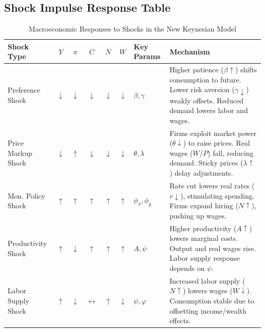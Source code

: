 \documentclass{article}
\begin{document}
{{\subsection{Shock Impulse Response Table}

\begin{table}[H]
\centering
\caption{Macroeconomic Responses to Shocks in the New Keynesian Model}
\label{table:shocks}
\footnotesize %
\setlength{\tabcolsep}{4pt} %
\renewcommand{\arraystretch}{1.2} %
\begin{tabularx}{\textwidth}{>{\raggedright\arraybackslash}p{2.2cm}cccccl>{\raggedright\arraybackslash}X}
\toprule
\textbf{Shock Type} & \(Y\) & \(\pi\) & \(C\) & \(N\) & \(W\) & \textbf{Key Params} & \textbf{Mechanism} \\
\midrule
Preference Shock & \(\downarrow\) & \(\downarrow\) & \(\downarrow\) & \(\downarrow\) & \(\downarrow\) 
& \(\beta, \gamma\) 
& Higher patience (\(\beta \uparrow\)) shifts consumption to future. Lower risk aversion (\(\gamma \downarrow\)) weakly offsets. Reduced demand lowers labor and wages. \\ 

Price Markup Shock & \(\downarrow\) & \(\uparrow\) & \(\downarrow\) & \(\downarrow\) & \(\downarrow\) 
& \(\theta, \lambda\) 
& Firms exploit market power (\(\theta \downarrow\)) to raise prices. Real wages (\(W/P\)) fall, reducing demand. Sticky prices (\(\lambda \uparrow\)) delay adjustments. \\ 

Mon. Policy Shock & \(\uparrow\) & \(\uparrow\) & \(\uparrow\) & \(\uparrow\) & \(\uparrow\) 
& \(\phi_\pi, \phi_y\) 
& Rate cut lowers real rates (\(r \downarrow\)), stimulating spending. Firms expand hiring (\(N \uparrow\)), pushing up wages. \\ 

Productivity Shock & \(\uparrow\) & \(\downarrow\) & \(\uparrow\) & \(\uparrow\) & \(\uparrow\) 
& \(A, \psi\) 
& Higher productivity (\(A \uparrow\)) lowers marginal costs. Output and real wages rise. Labor supply response depends on \(\psi\). \\ 

Labor Supply Shock & \(\uparrow\) & \(\downarrow\) & \(\leftrightarrow\) & \(\uparrow\) & \(\downarrow\) 
& \(\psi, \varphi\) 
& Increased labor supply (\(N \uparrow\)) lowers wages (\(W \downarrow\)). Consumption stable due to offsetting income/wealth effects. \\ 


\end{tabularx}
\end{table}}}
\end{document}
